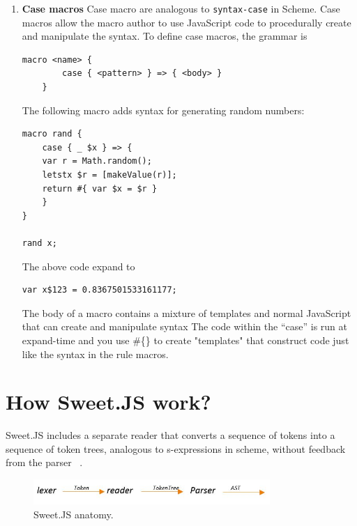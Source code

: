 \begin{enumerate}
\item {\bf Case macros }
Case macro are analogous to \texttt{syntax-case} in Scheme. Case macros allow the macro author to use JavaScript code to procedurally create and manipulate the syntax.
To define case macros, the grammar is
\begin{lstlisting}[frame=single]
	macro <name> {
  		case { <pattern> } => { <body> }
	}
\end{lstlisting}
The following macro adds syntax for generating random numbers:
\begin{lstlisting}[frame=single]
macro rand {
	case { _ $x } => {
	var r = Math.random();
	letstx $r = [makeValue(r)];
	return #{ var $x = $r }
	}
}

rand x;
\end{lstlisting}

The above code expand to

\begin{lstlisting}[frame=single]
	var x$123 = 0.8367501533161177;
\end{lstlisting}

The body of a macro contains a mixture of templates and normal JavaScript that can create and manipulate syntax
The code within the ``case'' is run at expand-time and you use \#\{\} to create "templates" that construct code just like the syntax in the rule macros.

\end{enumerate}

\section{How Sweet.JS work?}

Sweet.JS includes a separate reader that converts a sequence of tokens into a sequence of token trees, analogous to s-expressions in scheme, without feedback from the parser ~\cite{bib2}.

\begin{figure}[htb]
\centering
\includegraphics[width=0.8\textwidth]{images/Tokenizer.jpg}
\caption{Sweet.JS anatomy.} 
\label{fig:Tokenizer}
\end{figure}


